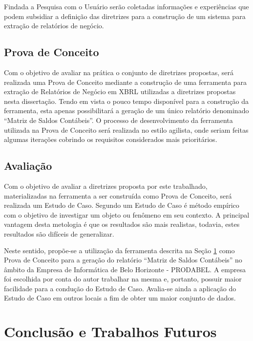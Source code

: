 \documentclass[msc,proposal,hidelot,hideabstract]{ppgccufmg} %
\begin{document}
Findada a Pesquisa com o Usuário serão coletadas informações e experiências que
podem subsidiar a definição das diretrizes para a construção de um sistema
para extração de relatórios de negócio.

\section{Prova de Conceito}
\label{sec:prova-conceito}

Com o objetivo de avaliar na prática o conjunto de diretrizes propostas, será
realizada uma Prova de Conceito mediante a construção de uma ferramenta para
extração de Relatórios de Negócio em XBRL utilizadas a diretrizes propostas
nesta dissertação. Tendo em vista o pouco tempo disponível para a construção da
ferramenta, esta apenas possibilitará a geração de um único relatório
denominado ``Matriz de Saldos Contábeis''. O processo de desenvolvimento da
ferramenta utilizada na Prova de Conceito será realizada no estilo agilista, onde seriam feitas algumas
iterações cobrindo os requisitos considerados mais prioritários.

\section{Avaliação}
\label{sec:avaliacao}

Com o objetivo de avaliar a diretrizes proposta por este trabalhado,
materializadas na ferramenta a ser construída como Prova de Conceito, será
realizada um Estudo de Caso. Segundo \cite{wohlin2012experimentation} um Estudo
de Caso é método empírico com o objetivo de investigar um objeto ou fenômeno em
seu contexto. A principal vantagem desta metologia é que os resultados são mais
realistas, todavia, estes resultados são difíceis de generalizar.

Neste sentido, propõe-se a utilização da ferramenta descrita na Seção \ref{sec:prova-conceito} como Prova de
Conceito para a geração do relatório ``Matriz de Saldos Contábeis'' no âmbito
da Empresa de Informática de Belo Horizonte - PRODABEL. A empresa foi escolhida
por conta do autor trabalhar na mesma e, portanto, possuir maior facilidade
para a condução do Estudo de Caso. Avalia-se ainda a aplicação do Estudo de
Caso em outros locais a fim de obter um maior conjunto de dados.

\chapter{Conclusão e Trabalhos Futuros}
\label{ch:conclusao_trab_futuros}
\end{document}
